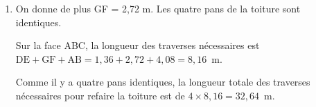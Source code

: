 \documentclass[10pt]{article}
\begin{document}
\begin{enumerate}
\begin{enumerate}
		\item On donne de plus GF = 2,72 m. Les quatre pans de la toiture sont identiques.
		

Sur la face ABC, la longueur des traverses nécessaires est\\
$\text{DE} + \text{GF} + \text{AB} = 1,36 + 2,72 + 4,08 = 8,16$~m.

Comme il y a quatre pans identiques, la longueur totale des traverses nécessaires pour refaire la toiture est de $4\times 8,16 = 32,64$~m.
	\end{enumerate} 
\end{enumerate}
\end{document}
